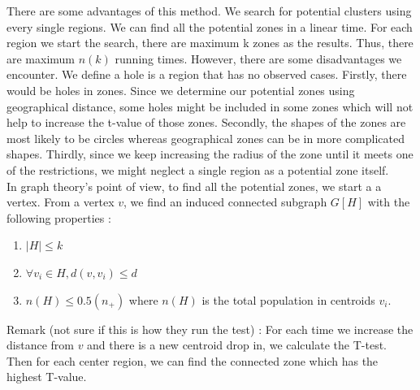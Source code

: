 \documentclass[12pt]{article}
\begin{document}
\begin{enumerate}
			There are some advantages of this method. We search for potential clusters using every single regions. We can find all the potential zones in a linear time. For each region we start the search, there are maximum k zones as the results. Thus, there are maximum $n(k)$ running times. However, there are some disadvantages we encounter. We define a hole is a region that has no observed cases. Firstly, there would be holes in zones. Since we determine our potential zones using geographical distance, some holes might be included in some zones which will not help to increase the t-value of those zones. Secondly, the shapes of the zones are most likely to be circles whereas geographical zones can be in more complicated shapes. Thirdly, since we keep increasing the radius of the zone until it meets one of the restrictions, we might neglect a single region as a potential zone itself. \\  
		In graph theory's point of view, to find all the potential zones, we start a a vertex. From a vertex $v$, we find an induced connected subgraph $G[H]$ with the following properties : \\
				\begin{enumerate}
					
					\item $|H| \leq k $ 
					\item $ \forall v_i \in  H, d(v,v_i) \leq d $
					\item $n(H) \leq 0.5(n_+)$ where $n(H)$ is the total population in centroids $v_i$. 
				\end{enumerate}   
				Remark (not sure if this is how they run the test) : For each time we increase the distance from $v$ and there is a new centroid drop in, we calculate the T-test. Then for each center region, we can find the connected zone which has the highest T-value. \\ 
				

\end{enumerate}
\end{document}

